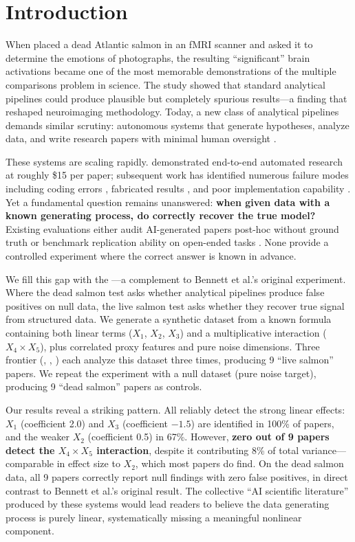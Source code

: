 \section{Introduction}
\label{sec:intro}

When \citet{bennett2009neural} placed a dead Atlantic salmon in an fMRI scanner and asked it to determine the emotions of photographs, the resulting ``significant'' brain activations became one of the most memorable demonstrations of the multiple comparisons problem in science.
The study showed that standard analytical pipelines could produce plausible but completely spurious results---a finding that reshaped neuroimaging methodology.
Today, a new class of analytical pipelines demands similar scrutiny: autonomous \aiscientist systems that generate hypotheses, analyze data, and write research papers with minimal human oversight \citep{lu2024ai}.

These systems are scaling rapidly.
\citet{lu2024ai} demonstrated end-to-end automated research at roughly \$15 per paper; subsequent work has identified numerous failure modes including coding errors \citep{beel2025evaluating}, fabricated results \citep{luo2025more}, and poor implementation capability \citep{zhu2025ai}.
Yet a fundamental question remains unanswered: \textbf{when given data with a known generating process, do \aiscientists correctly recover the true model?}
Existing evaluations either audit AI-generated papers post-hoc without ground truth \citep{luo2025more, beel2025evaluating} or benchmark replication ability on open-ended tasks \citep{starace2025paperbench}.
None provide a controlled experiment where the correct answer is known in advance.

We fill this gap with the \livesalmon---a complement to Bennett et al.'s original experiment.
Where the dead salmon test asks whether analytical pipelines produce false positives on null data, the live salmon test asks whether they recover true signal from structured data.
We generate a synthetic dataset from a known formula containing both linear terms ($X_1$, $X_2$, $X_3$) and a multiplicative interaction ($X_4 \times X_5$), plus correlated proxy features and pure noise dimensions.
Three frontier \llms (\gptmodel, \claudemodel, \geminimodel) each analyze this dataset three times, producing 9 ``live salmon'' papers.
We repeat the experiment with a null dataset (pure noise target), producing 9 ``dead salmon'' papers as controls.

Our results reveal a striking pattern.
All \aiscientists reliably detect the strong linear effects: $X_1$ (coefficient 2.0) and $X_3$ (coefficient $-1.5$) are identified in 100\% of papers, and the weaker $X_2$ (coefficient 0.5) in 67\%.
However, \textbf{zero out of 9 papers detect the $X_4 \times X_5$ interaction}, despite it contributing 8\% of total variance---comparable in effect size to $X_2$, which most papers do find.
On the dead salmon data, all 9 papers correctly report null findings with zero false positives, in direct contrast to Bennett et al.'s original result.
The collective ``AI scientific literature'' produced by these systems would lead readers to believe the data generating process is purely linear, systematically missing a meaningful nonlinear component.

